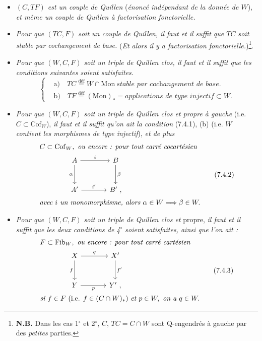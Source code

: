 \documentclass[11pt]{article}
\newcommand{\printedpage}[1]{\marginpar{\footnotesize p.~#1}}
\newcommand{\msp}[1]{\marginpar{\footnotesize [#1]}}
\newcommand{\Mon}{\mathrm{Mon}}
\newcommand{\Cof}{\mathrm{Cof}}
\newcommand{\Fib}{\mathrm{Fib}}
\begin{document}
\begin{itemize}[leftmargin=*]
\item[1$^\circ$)] \textit{$(C,TF)$ est un couple de Quillen} (\textit{énoncé indépendant de la donnée de $W$}), \textit{et même un couple de Quillen à factorisation fonctorielle.}
\item[2$^\circ$)] \textit{Pour que $(TC,F)$ soit un couple de Quillen, il faut et il suffit que $TC$ soit stable par cochangement de base.} (\textit{Et alors il y a factorisation fonctorielle.})\footnote[36]{\textbf{N.B.} Dans les cas 1$^\circ$ et 2$^\circ$, $C$, $TC=C\cap W$ sont Q-engendrés à gauche par des \textit{petites} parties.}.
\item[3$^\circ$)] \textit{Pour que $(W,C,F)$ soit un triple de Quillen clos, il faut et il suffit que les conditions suivantes soient satisfaites.}
\[
\left\{
\begin{aligned}
&\text{a)}\quad TC \overset{\text{déf}}{=} W\cap \Mon\ \textit{stable par cochangement de base.}\\
&\text{b)}\quad TF \overset{\text{déf}}{=} (\Mon)_* = \textit{applications de type injectif} \subset W.
\end{aligned}
\right.
\tag*{(7.4.1)}
\]
\item[4$^\circ$)] \msp{page 99}\textit{Pour que $(W,C,F)$ soit un triple de Quillen clos et propre à gauche} (i.e. $C\subset \Cof_W$), \textit{il faut et il suffit qu'on ait la condition} (7.4.1), (b) (i.e. \textit{$W$ contient les morphismes de type injectif}), \textit{et de plus}
\[
\begin{aligned}
&C\subset \Cof_W,\ \textit{ou encore : pour tout carré cocartésien}\\
&\qquad\qquad\begin{tikzcd}[ampersand replacement=\&, row sep=large, column sep=large]
A \arrow[r, "i"] \arrow[d, "\alpha"'] \& B \arrow[d, "\beta"] \\
A' \arrow[r, "i'"] \& B'\ ,
\end{tikzcd}\\
&\textit{avec $i$ un monomorphisme, alors } \alpha\in W \Longrightarrow \beta\in W.
\end{aligned}
\tag*{(7.4.2)}
\]

\item[5$^\circ$)] \printedpage{55}
\textit{Pour que $(W,C,F)$ soit un triple de Quillen clos et} propre, \textit{il faut et il suffit que les deux conditions de 4$^\circ$ soient satisfaites, ainsi que l'on ait :}
\[
\begin{aligned}
&F\subset \Fib_W,\ \textit{ou encore : pour tout carré cartésien}\\
&\qquad\qquad\begin{tikzcd}[ampersand replacement=\&, row sep=large, column sep=large]
X \arrow[r, "q"] \arrow[d, "f"'] \& X' \arrow[d, "f'"] \\
Y \arrow[r, "p"'] \& Y'\ ,
\end{tikzcd}\\
&\textit{si } f\in F \ (\text{i.e. } f\in (C\cap W)_*)\ \textit{et } p\in W,\ \textit{on a } q\in W.
\end{aligned}
\tag*{(7.4.3)}
\]
\end{itemize}
\end{document}
